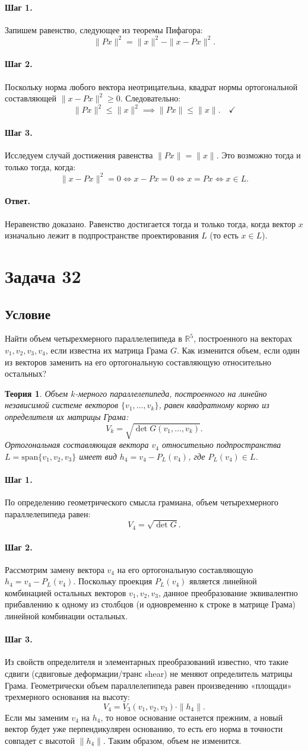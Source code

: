 \documentclass[12pt,a4paper]{article}
\theoremstyle{solution}
\newtheorem*{theory}{Теория}
\newcommand{\task}[1]{\newpage\section*{Задача #1}}
\newcommand{\answer}{\paragraph{Ответ.}}
\newcommand{\step}[1]{\paragraph{Шаг #1.}}
\newcommand{\R}{\mathbb{R}}
\begin{document}
\step{1} Запишем равенство, следующее из теоремы Пифагора:
\[
\|Px\|^2 = \|x\|^2 - \|x - Px\|^2.
\]

\step{2} Поскольку норма любого вектора неотрицательна, квадрат нормы ортогональной составляющей $\|x - Px\|^2 \geq 0$. Следовательно:
\[
\|Px\|^2 \leq \|x\|^2 \implies \|Px\| \leq \|x\|. \quad\checkmark
\]

\step{3} Исследуем случай достижения равенства $\|Px\| = \|x\|$. Это возможно тогда и только тогда, когда:
\[
\|x - Px\|^2 = 0 \iff x - Px = 0 \iff x = Px \iff x \in L.
\]

\answer
Неравенство доказано. Равенство достигается тогда и только тогда, когда вектор $x$ изначально лежит в подпространстве проектирования $L$ (то есть $x \in L$).

\task{32}
\subsection*{Условие}
Найти объем четырехмерного параллелепипеда в $\R^5$, построенного на векторах $v_1, v_2, v_3, v_4$, если известна их матрица Грама $G$. Как изменится объем, если один из векторов заменить на его ортогональную составляющую относительно остальных?

\begin{theory}
Объем $k$-мерного параллелепипеда, построенного на линейно независимой системе векторов $\{v_1, \ldots, v_k\}$, равен квадратному корню из определителя их матрицы Грама:
\[
V_k = \sqrt{\det G(v_1, \ldots, v_k)}.
\]
Ортогональная составляющая вектора $v_4$ относительно подпространства $L = \mathrm{span}\{v_1, v_2, v_3\}$ имеет вид $h_4 = v_4 - P_L(v_4)$, где $P_L(v_4) \in L$.
\end{theory}

\step{1} По определению геометрического смысла грамиана, объем четырехмерного параллелепипеда равен:
\[
V_4 = \sqrt{\det G}.
\]

\step{2} Рассмотрим замену вектора $v_4$ на его ортогональную составляющую $h_4 = v_4 - P_L(v_4)$. Поскольку проекция $P_L(v_4)$ является линейной комбинацией остальных векторов $v_1, v_2, v_3$, данное преобразование эквивалентно прибавлению к одному из столбцов (и одновременно к строке в матрице Грама) линейной комбинации остальных.

\step{3} Из свойств определителя и элементарных преобразований известно, что такие сдвиги (сдвиговые деформации/транс shear) не меняют определитель матрицы Грама. 
Геометрически объем параллелепипеда равен произведению «площади» трехмерного основания на высоту:
\[
V_4 = V_3(v_1, v_2, v_3) \cdot \|h_4\|.
\]
Если мы заменим $v_4$ на $h_4$, то новое основание останется прежним, а новый вектор будет уже перпендикулярен основанию, то есть его норма в точности совпадет с высотой $\|h_4\|$. Таким образом, объем не изменится.
\end{document}

